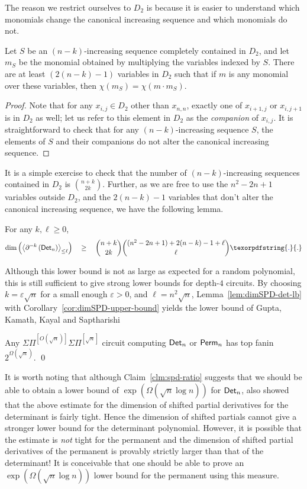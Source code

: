 \documentclass{birkjour}
\newcommand{\spaced}[1]{\quad#1\quad}
\newcommand{\SPD}[3]{\inangle{\partial^{=#1}\inparen{#3}}_{\leq #2}}
\newcommand{\mySPSP}[2]{\Sigma\Pi^{[#1]}\Sigma\Pi^{[#2]}}
\renewcommand{\epsilon}{\varepsilon}
\providecommand{\DIFaddtex}[1]{{\protect\color{blue}\uwave{#1}}} %
\providecommand{\DIFaddbegin}{} %
\providecommand{\DIFaddend}{} %
\providecommand{\DIFadd}[1]{\texorpdfstring{\DIFaddtex{#1}}{#1}} %
\begin{document}
The reason we restrict ourselves to $D_2$ is because it is easier to understand which monomials change the canonical increasing sequence and which monomials do not. 

\begin{lemma}\label{lem:forbidden-variables}
Let $S$ be an $(n-k)$-increasing sequence completely contained in $D_2$, and let $m_S$ be the monomial obtained by multiplying the variables indexed by $S$. There are at least $(2(n-k)-1)$ variables in $D_2$ such that if $m$ is any monomial over these variables, then $\chi(m_S) = \chi(m\cdot m_S)$. 
\end{lemma}
\begin{proof}
Note that for any $x_{i,j} \in D_2$ other than $x_{n,n}$, exactly one of $x_{i+1,j}$ or $x_{i,j+1}$ is in $D_2$ as well; let us refer to this element in $D_2$ as the \emph{companion} of $x_{i,j}$.  It is straightforward to check that for any $(n-k)$-increasing sequence $S$, the elements of $S$ and their companions do not alter the canonical increasing sequence. 
\end{proof}

It is a simple exercise to check that the number of $(n-k)$-increasing sequences contained in $D_2$ is $\binom{n+k}{2k}$. Further, as we are free to use the $n^2 - 2n + 1$ variables outside $D_2$, and the $2(n-k) -1$ variables that don't alter the canonical increasing sequence, we have the following lemma. 

\begin{lemma}\label{lem:dimSPD-det-lb}
For any $k,\ell \geq 0$, 
$$
\dim\inparen{\SPD{k}{\ell}{\Det_n}} \spaced{\geq} \binom{n+k}{2k}\binom{(n^2 - 2n + 1) + 2(n-k) -1 + \ell}{\ell}\DIFaddbegin \DIFadd{.
}\DIFaddend $$
\end{lemma}

Although this lower bound is not as large as expected for a random polynomial, this is still sufficient to give strong lower bounds for depth-$4$ circuits. By choosing $k = \epsilon \sqrt{n}$ for a small enough $\epsilon > 0$, and $\ell = n^2 \sqrt{n}$, Lemma~\ref{lem:dimSPD-det-lb} with Corollary~\ref{cor:dimSPD-upper-bound} yields the lower bound of Gupta, Kamath, Kayal and Saptharishi \cite{gkks13}

\begin{theorem}
Any $\mySPSP{O(\sqrt{n})}{\sqrt{n}}$ circuit computing $\mathsf{Det}_n$ or $\mathsf{Perm}_n$ has top fanin $2^{\Omega(\sqrt{n})}$. \qed
\end{theorem}

It is worth noting that although Claim~\ref{clm:spd-ratio} suggests that we should be able to obtain a lower bound of $\exp(\Omega(\sqrt{n}\log n))$ for $\mathsf{Det}_n$, \cite{gkks13} also showed that the above estimate for the dimension of shifted partial derivatives for the determinant is fairly tight. Hence the dimension of shifted partials cannot give a stronger lower bound for the determinant polynomial. However, it is possible that the estimate is \emph{not} tight for the permanent and the dimension of shifted partial derivatives of the permanent is provably strictly larger than that of the determinant! It is conceivable that one should be able to prove an $\exp(\Omega(\sqrt{n}\log n))$ lower bound for the permanent using this measure. 
\end{document}
